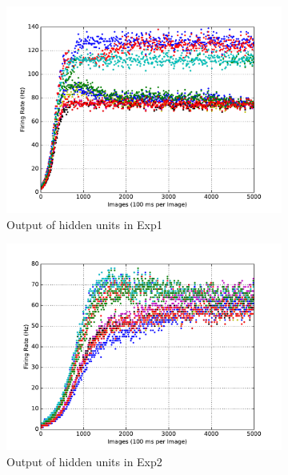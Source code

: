 \begin{figure}
\begin{subfigure}[t]{0.4\textwidth}
		\includegraphics[width=\textwidth]{pics_sdlm/01_exp_SAE_Orig_long/exp1_hid_s.pdf}
		\caption{Output of hidden units in Exp1}
	\end{subfigure}
	\begin{subfigure}[t]{0.4\textwidth}
		\includegraphics[width=\textwidth]{pics_sdlm/01_exp_SAE_Orig_long/exp2_hid_s.pdf}
		\caption{Output of hidden units in Exp2}
	\end{subfigure}\\
	\begin{subfigure}[t]{0.4\textwidth}

\end{subfigure}
\end{figure}
